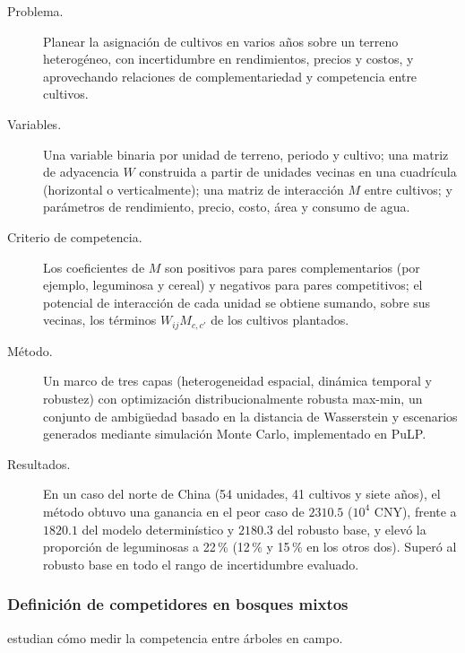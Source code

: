 \begin{description}
  \item[Problema.] Planear la asignación de cultivos en varios años sobre un terreno heterogéneo, con incertidumbre en rendimientos, precios y costos, y aprovechando relaciones de complementariedad y competencia entre cultivos.
  \item[Variables.] Una variable binaria por unidad de terreno, periodo y cultivo; una matriz de adyacencia $W$ construida a partir de unidades vecinas en una cuadrícula (horizontal o verticalmente); una matriz de interacción $M$ entre cultivos; y parámetros de rendimiento, precio, costo, área y consumo de agua.
  \item[Criterio de competencia.] Los coeficientes de $M$ son positivos para pares complementarios (por ejemplo, leguminosa y cereal) y negativos para pares competitivos; el potencial de interacción de cada unidad se obtiene sumando, sobre sus vecinas, los términos $W_{ij}M_{c,c'}$ de los cultivos plantados.
  \item[Método.] Un marco de tres capas (heterogeneidad espacial, dinámica temporal y robustez) con optimización distribucionalmente robusta max-min, un conjunto de ambigüedad basado en la distancia de Wasserstein y escenarios generados mediante simulación Monte Carlo, implementado en PuLP.
  \item[Resultados.] En un caso del norte de China (54 unidades, 41 cultivos y siete años), el método obtuvo una ganancia en el peor caso de $2310.5$ ($10^{4}$ CNY), frente a $1820.1$ del modelo determinístico y $2180.3$ del robusto base, y elevó la proporción de leguminosas a 22\,\% (12\,\% y 15\,\% en los otros dos). Superó al robusto base en todo el rango de incertidumbre evaluado.
\end{description}

\subsubsection{Definición de competidores en bosques mixtos}

\textcite{kobal2025} estudian cómo medir la competencia entre árboles en campo.

